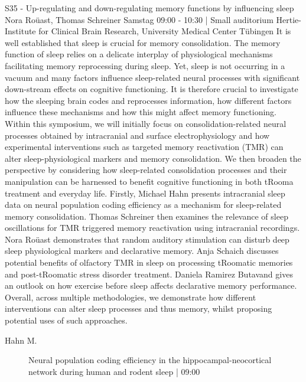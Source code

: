 
            \begin{symposium}
            {S35 - Up-regulating and down-regulating memory functions by influencing sleep}
            {Nora Roüast, Thomas Schreiner}
            {Samstag 09:00 - 10:30 | Small auditorium}
            {Hertie-Institute for Clinical Brain Research, University Medical Center Tübingen}
            It is well established that sleep is crucial for memory consolidation. The memory function of sleep relies on a delicate interplay of physiological mechanisms facilitating memory reprocessing during sleep. Yet, sleep is not occurring in a vacuum and many factors influence sleep-related neural processes with significant down-stream effects on cognitive functioning. It is therefore crucial to investigate how the sleeping brain codes and reprocesses information, how different factors influence these mechanisms and how this might affect memory functioning.
Within this symposium, we will initially focus on consolidation-related neural processes obtained by intracranial and surface electrophysiology and how experimental interventions such as targeted memory reactivation (TMR) can alter sleep-physiological markers and memory consolidation. We then broaden the perspective by considering how sleep-related consolidation processes and their manipulation can be harnessed to benefit cognitive functioning in both tRooma treatment and everyday life.
Firstly, Michael Hahn presents intracranial sleep data on neural population coding efficiency as a mechanism for sleep-related memory consolidation. Thomas Schreiner then examines the relevance of sleep oscillations for TMR triggered memory reactivation using intracranial recordings. Nora Roüast demonstrates that random auditory stimulation can disturb deep sleep physiological markers and declarative memory. Anja Schaich discusses potential benefits of olfactory TMR in sleep on processing tRoomatic memories and post-tRoomatic stress disorder treatment. Daniela Ramirez Butavand gives an outlook on how exercise before sleep affects declarative memory performance.
Overall, across multiple methodologies, we demonstrate how different interventions can alter sleep processes and thus memory, whilst proposing potential uses of such approaches.
            \begin{description}    
            
                \item [ Hahn M.] Neural population coding efficiency in the hippocampal-neocortical network during human and rodent sleep \textcolor{mygray}{ | 09:00}    
                

\end{description}
\end{symposium}
